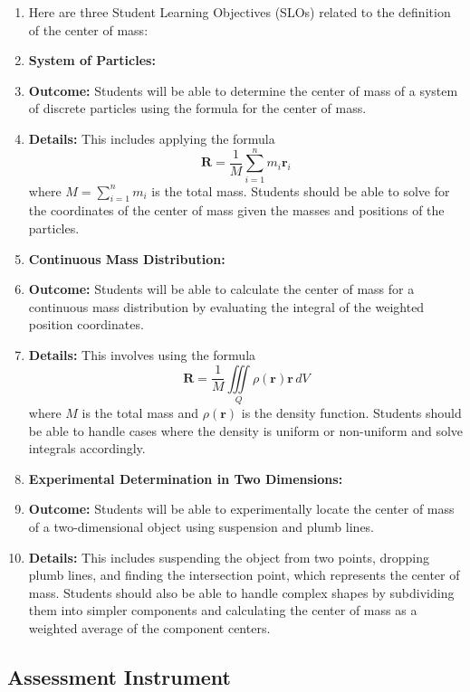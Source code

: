 \begin{enumerate}
    \item Here are three Student Learning Objectives (SLOs) related to the definition of the center of mass:
    \item \textbf{System of Particles:}
    \item \textbf{Outcome:} Students will be able to determine the center of mass of a system of discrete particles using the formula for the center of mass.
    \item \textbf{Details:} This includes applying the formula $$\mathbf{R} = \frac{1}{M} \sum_{i=1}^n m_i \mathbf{r}_i$$ where \( M = \sum_{i=1}^n m_i \) is the total mass. Students should be able to solve for the coordinates of the center of mass given the masses and positions of the particles.
    \item \textbf{Continuous Mass Distribution:}
    \item \textbf{Outcome:} Students will be able to calculate the center of mass for a continuous mass distribution by evaluating the integral of the weighted position coordinates.
    \item \textbf{Details:} This involves using the formula $$\mathbf{R} = \frac{1}{M} \iiint\limits_{Q} \rho(\mathbf{r}) \mathbf{r} \, dV$$ where \( M \) is the total mass and \( \rho(\mathbf{r}) \) is the density function. Students should be able to handle cases where the density is uniform or non-uniform and solve integrals accordingly.
    \item \textbf{Experimental Determination in Two Dimensions:}
    \item \textbf{Outcome:} Students will be able to experimentally locate the center of mass of a two-dimensional object using suspension and plumb lines.
    \item \textbf{Details:} This includes suspending the object from two points, dropping plumb lines, and finding the intersection point, which represents the center of mass. Students should also be able to handle complex shapes by subdividing them into simpler components and calculating the center of mass as a weighted average of the component centers.
\end{enumerate}

\subsection{Assessment Instrument}

